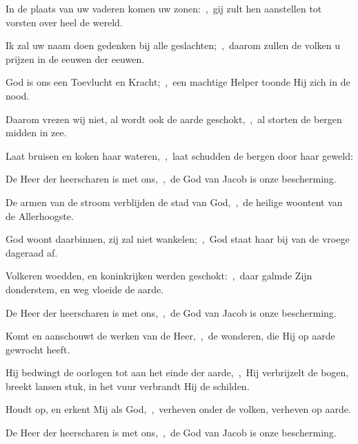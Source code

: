 \documentclass[12pt,twoside,a5paper]{article}
\begin{document}

\begin{halfparskip}
  In de plaats van uw vaderen komen uw zonen:~\sep\ gij zult hen aanstellen tot vorsten over heel de wereld.

  Ik zal uw naam doen gedenken bij alle geslachten;~\sep\ daarom zullen de volken u prijzen in de eeuwen der eeuwen.
\end{halfparskip}



\begin{halfparskip}
  God is ons een Toevlucht en Kracht;~\sep\ een machtige Helper toonde Hij zich in de nood.


  Daarom vrezen wij niet, al wordt ook de aarde geschokt,~\sep\ al storten de bergen midden in zee.

  Laat bruisen en koken haar wateren,~\sep\ laat schudden de bergen door haar geweld:

  De Heer der heerscharen is met ons,~\sep\ de God van Jacob is onze bescherming.
\end{halfparskip}


\begin{halfparskip}
  De armen van de stroom verblijden de stad van God,~\sep\ de heilige woontent van de Allerhoogste.

  God woont daarbinnen, zij zal niet wankelen;~\sep\ God staat haar bij van de vroege dageraad af.

  Volkeren woedden, en koninkrijken werden geschokt:~\sep\ daar galmde Zijn donderstem, en weg vloeide de aarde.

  De Heer der heerscharen is met ons,~\sep\ de God van Jacob is onze bescherming.
\end{halfparskip}


\begin{halfparskip}
  Komt en aanschouwt de werken van de Heer,~\sep\ de wonderen, die Hij op aarde gewrocht heeft.

  Hij bedwingt de oorlogen tot aan het einde der aarde,~\sep\ Hij verbrijzelt de bogen, breekt lansen stuk, in het vuur verbrandt Hij de schilden.

  Houdt op, en erkent Mij als God,~\sep\ verheven onder de volken, verheven op aarde.

  De Heer der heerscharen is met ons,~\sep\ de God van Jacob is onze bescherming.
\end{halfparskip}
\end{document}
